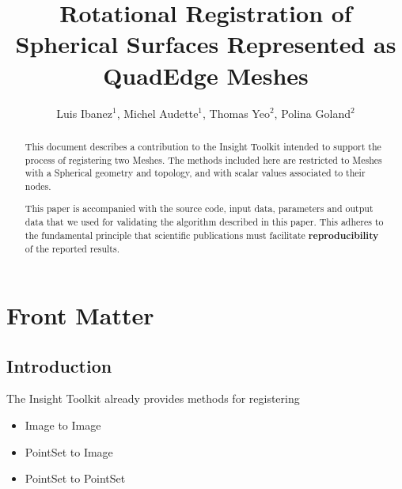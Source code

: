 \documentclass{InsightArticle}
\title{Rotational Registration of Spherical Surfaces Represented as QuadEdge Meshes}
\author{Luis Ibanez$^{1}$, Michel Audette$^{1}$, Thomas Yeo$^{2}$, Polina Goland$^{2}$}
\newcommand{\IJhandlerIDnumber}{1338}
\begin{document}
%
% 
\IJhandlefooter{\IJhandlerIDnumber}


\ifpdf
\else
\fi


\maketitle


\ifhtml
\chapter*{Front Matter\label{front}}
\fi


\begin{abstract}
\noindent
This document describes a contribution to the Insight Toolkit intended to
support the process of registering two Meshes.  The methods included here are
restricted to Meshes with a Spherical geometry and topology, and with scalar
values associated to their nodes.

This paper is accompanied with the source code, input data, parameters and
output data that we used for validating the algorithm described in this paper.
This adheres to the fundamental principle that scientific publications must
facilitate \textbf{reproducibility} of the reported results.
\end{abstract}

\tableofcontents

\section{Introduction}

The Insight Toolkit already provides methods for registering

\begin{itemize}
\item Image to Image
\item PointSet to Image
\item PointSet to PointSet
\end{itemize}
\end{document}
